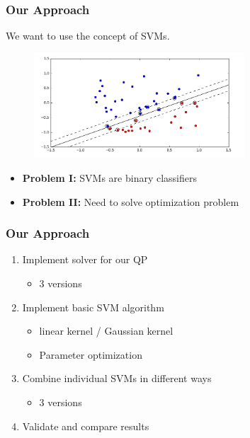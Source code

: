 \documentclass[12pt, compress]{beamer}
\newcommand{\titleB}{Our Approach}
\begin{document}
\begin{frame}
	\frametitle{\titleB}
	We want to use the concept of SVMs.
	
	\begin{figure}[h]
		\includegraphics[width=0.7\textwidth]{svm_examplegraphic}
	\end{figure}
	
	
	\begin{itemize}
		\item \textbf{Problem I:} SVMs are binary classifiers 
		\item \textbf{Problem II:} Need to solve optimization problem
	\end{itemize}

\end{frame}


\begin{frame}
	\frametitle{\titleB}
	\begin{enumerate}
		\item Implement solver for our QP
		\begin{itemize}
			\item 3 versions
		\end{itemize}
		\item Implement basic SVM algorithm
		\begin{itemize}
			\item linear kernel / Gaussian kernel
			\item Parameter optimization
		\end{itemize}
		\item Combine individual SVMs in different ways
		\begin{itemize}
			\item 3 versions
		\end{itemize}
		\item Validate and compare results 
		\
	\end{enumerate}
\end{frame}
\end{document}
